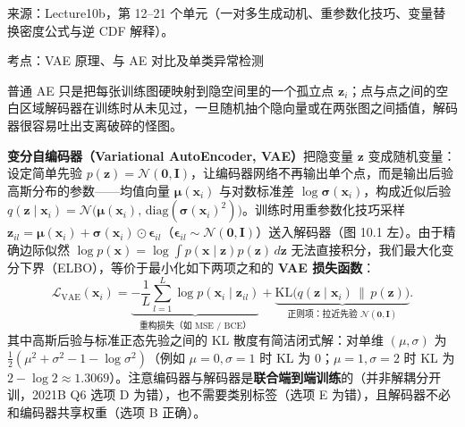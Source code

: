 来源：Lecture10b，第 12–21 个单元（一对多生成动机、重参数化技巧、变量替换密度公式与逆 CDF 解释）。



考点：VAE 原理、与 AE 对比及单类异常检测 

普通 AE 只是把每张训练图硬映射到隐空间里的一个孤立点 $\mathbf{z}_i$；点与点之间的空白区域解码器在训练时从未见过，一旦随机抽个隐向量或在两张图之间插值，解码器很容易吐出支离破碎的怪图。

\textbf{变分自编码器（Variational AutoEncoder, VAE）}把隐变量 $\mathbf{z}$ 变成随机变量：设定简单先验 $p(\mathbf{z})=\mathcal{N}(\mathbf{0},\mathbf{I})$，让编码器网络不再输出单个点，而是输出后验高斯分布的参数——均值向量 $\boldsymbol{\mu}(\mathbf{x}_i)$ 与对数标准差 $\log\boldsymbol{\sigma}(\mathbf{x}_i)$，构成近似后验 $q(\mathbf{z}\mid\mathbf{x}_i)=\mathcal{N}\bigl(\boldsymbol{\mu}(\mathbf{x}_i),\,\mathrm{diag}(\boldsymbol{\sigma}(\mathbf{x}_i)^2)\bigr)$。训练时用重参数化技巧采样 $\mathbf{z}_{il}=\boldsymbol{\mu}(\mathbf{x}_i)+\boldsymbol{\sigma}(\mathbf{x}_i)\odot\boldsymbol{\epsilon}_{il}$（$\boldsymbol{\epsilon}_{il}\sim\mathcal{N}(\mathbf{0},\mathbf{I})$）送入解码器（图 10.1 左）。由于精确边际似然 $\log p(\mathbf{x})=\log\int p(\mathbf{x}\mid\mathbf{z})p(\mathbf{z})\,d\mathbf{z}$ 无法直接积分，我们最大化变分下界（ELBO），等价于最小化如下两项之和的 \textbf{VAE 损失函数}：
\[
\mathcal{L}_{\text{VAE}}(\mathbf{x}_i) = \underbrace{-\frac{1}{L}\sum_{l=1}^L \log p(\mathbf{x}_i \mid \mathbf{z}_{il})}_{\text{重构损失（如 MSE / BCE）}}
+ \underbrace{\mathrm{KL}\bigl(q(\mathbf{z}\mid\mathbf{x}_i)\,\|\,p(\mathbf{z})\bigr)}_{\text{正则项：拉近先验 } \mathcal{N}(\mathbf{0},\mathbf{I})}.
\tag{10.4}
\]
其中高斯后验与标准正态先验之间的 KL 散度有简洁闭式解：对单维 $(\mu,\sigma)$ 为 $\frac{1}{2}(\mu^2 + \sigma^2 - 1 - \log\sigma^2)$（例如 $\mu=0,\sigma=1$ 时 KL 为 $0$；$\mu=1,\sigma=2$ 时 KL 为 $2-\log 2\approx 1.3069$）。注意编码器与解码器是\textbf{联合端到端训练}的（并非解耦分开训，2021B Q6 选项 D 为错），也不需要类别标签（选项 E 为错），且解码器不必和编码器共享权重（选项 B 正确）。


